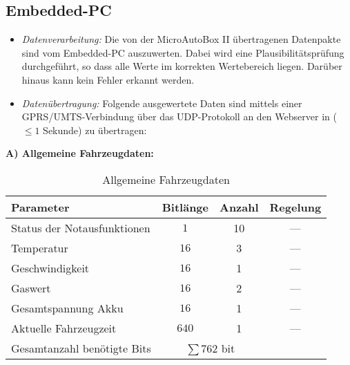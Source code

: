 \documentclass[fontsize = 12pt, paper = a4]{scrreprt}
\begin{document}

\subsection{\gls{Embedded-PC}}

\begin{itemize}

\item \textit{Datenverarbeitung:} Die von der \gls{MicroAutoBox II} übertragenen Datenpakte sind vom \gls{Embedded-PC} auszuwerten. Dabei wird eine Plausibilitätsprüfung durchgeführt, so dass alle Werte im korrekten Wertebereich liegen. Darüber hinaus kann kein Fehler erkannt werden.

\item \textit{Datenübertragung:} Folgende ausgewertete Daten sind mittels einer \gls{GPRS}/\gls{UMTS}-Verbindung über das UDP-Protokoll an den Webserver in  ($\leq 1$ Sekunde) zu übertragen:  \newpage

\end{itemize}


\textbf{A) Allgemeine Fahrzeugdaten:} 

\begin{table}[h]
\caption{Allgemeine Fahrzeugdaten}

\begin{tabular}{ l | c | c | c }

\toprule[1.5pt]

\textbf{Parameter} & \textbf{Bitlänge} 
& \textbf{Anzahl} &\textbf{Regelung} \\ 

\midrule
Status der Notausfunktionen     & $1$   & 10 & --- \\ 
Temperatur                      & $16$  & 3  & --- \\
Geschwindigkeit                 & $16$  & 1  & --- \\ 
Gaswert                         & $16$  & 2  & --- \\ 
Gesamtspannung Akku             & $16$  & 1  & --- \\ 
Aktuelle Fahrzeugzeit           & $640$ & 1  & --- \\

\midrule
Gesamtanzahl benötigte Bits & \multicolumn{2}{c}{$\sum 762$ bit} \\

\bottomrule[1.5pt]

\end{tabular}

\label{Allgemeine Fahrzeugdaten}
\end{table}
\end{document}
